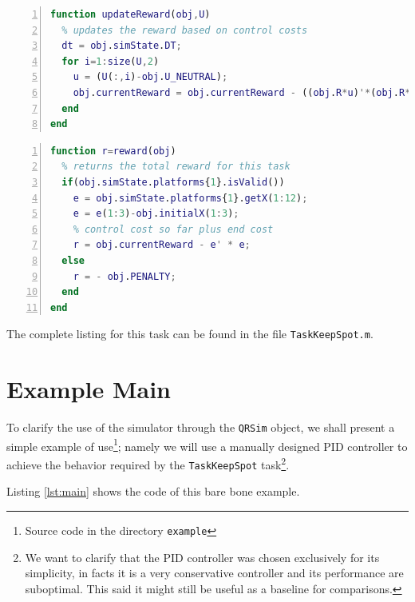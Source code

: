 \documentclass[a4paper,11pt]{report}
\newcommand{\snamettt}{\texttt{QRSim}\xspace}
\begin{document}
\begin{lstlisting}[float=ht!bp,caption=TaskKeepSpot updateReward(U) method,language=Matlab,frame=lines,label=lst:updatereward,numbers=left,basicstyle=\small]
function updateReward(obj,U)         
  % updates the reward based on control costs
  dt = obj.simState.DT;
  for i=1:size(U,2)
    u = (U(:,i)-obj.U_NEUTRAL);
    obj.currentReward = obj.currentReward - ((obj.R*u)'*(obj.R*u))*dt;
  end
end
\end{lstlisting}    
\begin{lstlisting}[float=ht!bp,caption=TaskKeepSpot reward() method,language=Matlab,frame=lines,label=lst:reward,numbers=left,basicstyle=\small]   
function r=reward(obj) 
  % returns the total reward for this task      
  if(obj.simState.platforms{1}.isValid())
    e = obj.simState.platforms{1}.getX(1:12);
    e = e(1:3)-obj.initialX(1:3);
    % control cost so far plus end cost
    r = obj.currentReward - e' * e; 
  else
    r = - obj.PENALTY;
  end                
end
\end{lstlisting}
The complete listing for this task can be found in the file \texttt{TaskKeepSpot.m}.  

\section{Example Main}
To clarify the use of the simulator through the \snamettt object, we shall present a simple example of use\footnote{Source code in the directory \texttt{example}}; namely we will use a manually designed PID controller to achieve the behavior required by the \texttt{TaskKeepSpot} task\footnote{We want to clarify that the PID controller was chosen exclusively for its simplicity, in facts it is a very conservative controller and its performance are suboptimal. This said it might still be useful as a baseline for comparisons.}.

Listing \ref{lst:main} shows the code of this bare bone example. 
\end{document}
